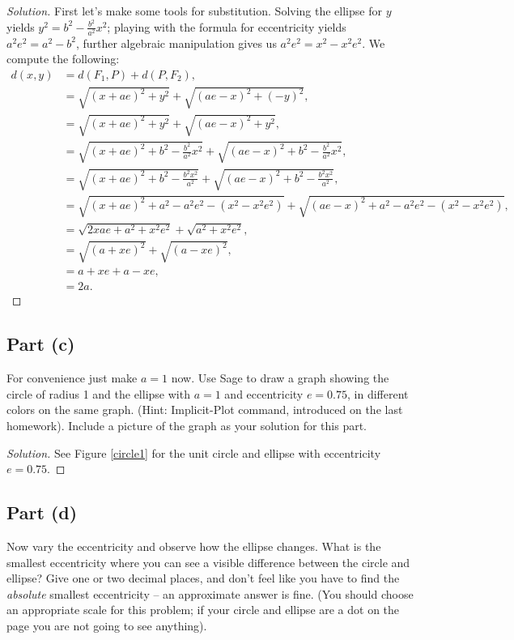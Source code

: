 \documentclass[letterpaper, 12pt]{amsart}
\theoremstyle{definition}  %
\begin{document}
		\begin{proof}[Solution]
		First let's make some tools for substitution.
		Solving the ellipse for $y$ yields $y^2 = b^2 - \tfrac{b^2}{a^2}x^{2}$; playing with the formula for eccentricity yields $a^2e^2 = a^2 - b^2$, further algebraic manipulation gives us $a^2e^2 = x^2 - x^2e^2$.
			We compute the following:
				\begin{align*}
				d(x,y) &= d(F_1,P) + d(P,F_2), \\
	            &= \sqrt{(x + ae)^2 + y^2} + \sqrt{(ae - x)^2 + (-y)^2}, \\
	            &= \sqrt{(x + ae)^2 + y^2} + \sqrt{(ae - x)^2 + y^2}, \\
				&= \sqrt{(x + ae)^2 + b^2 - \tfrac{b^2}{a^2}x^2} + \sqrt{(ae - x)^2 + b^2 - \tfrac{b^2}{a^2}x^{2}}, \\
				&= \sqrt{(x + ae)^2 + b^2 - \tfrac{b^2x^2}{a^2}} + \sqrt{(ae - x)^2 + b^2 - \tfrac{b^2x^2}{a^2}}, \\
	            &= \sqrt{(x + ae)^2 + a^2 - a^2e^2 - (x^2 - x^2e^2)} + \sqrt{(ae - x)^2 + a^2 - a^2e^2 - (x^2 - x^2e^2)}, \\
	            &= \sqrt{2xae + a^2 + x^2e^2} + \sqrt{a^2 + x^2e^2}, \\
	            &= \sqrt{(a + xe)^2} + \sqrt{(a - xe)^2}, \\
	            &= a + xe + a - xe, \\
	            &= 2a.
				\end{align*}
				
		\end{proof}

		\subsection*{Part (c)}
		For convenience just make $a = 1$ now. 
		Use Sage to draw a graph showing the circle of radius 1 and the ellipse with $a = 1$ and eccentricity $e = 0.75$, in different colors on the same graph. 
		(Hint: Implicit-Plot command, introduced on the last homework). 
		Include a picture of the graph as your solution for this part.

		\begin{proof}[Solution]
		See Figure \ref{circle1} for the unit circle and ellipse with eccentricity $e = 0.75$.
		\end{proof}

		\subsection*{Part (d)}
		Now vary the eccentricity and observe how the ellipse changes. 
		What is the smallest eccentricity where you can see a visible difference between the circle and ellipse? 
		Give one or two decimal places, and don’t feel like you have to find the \textit{absolute} smallest eccentricity -- an approximate answer is fine. 
		(You should choose an appropriate scale for this problem; if your circle and ellipse are a dot on the page you are not going to see anything).
\end{document}
